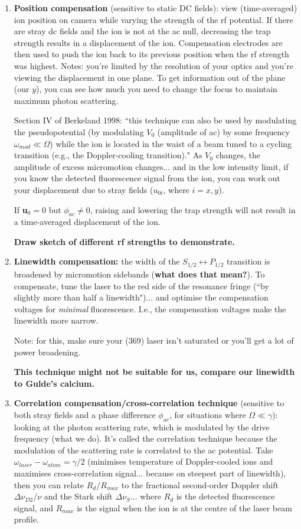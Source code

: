 \documentclass{article}
\begin{document}
\begin{enumerate}
\item \textbf{Position compensation} (sensitive to static DC fields): view (time-averaged) ion position on camera while varying the strength of the rf potential. If there are stray dc fields and the ion is not at the ac null, decreasing the trap strength results in a displacement of the ion. Compensation electrodes are then used to push the ion back to its previous position when the rf strength was highest. Notes: you're limited by the resolution of your optics and you're viewing the displacement in one plane. To get information out of the plane (our $y$), you can see how much you need to change the focus to maintain maximum photon scattering. 

Section IV of Berkeland 1998: ``this technique can also be used by modulating the pseudopotential (by modulating $V_0$ (amplitude of ac) by some frequency $\omega_{mod} \ll \Omega$) while the ion is located in the waist of a beam tuned to a cycling transition (e.g., the Doppler-cooling transition)." As $V_0$ changes, the amplitude of excess micromotion changes... and in the low intensity limit, if you know the detected fluorescence signal from the ion, you can work out your displacement due to stray fields ($u_{0i}$, where $i = x, y$).

If \textbf{u}$_0 = 0$ but $\phi_{ac} \neq 0$, raising and lowering the trap strength will not result in a time-averaged displacement of the ion.

\textbf{Draw sketch of different rf strengths to demonstrate.}

\item \textbf{Linewidth compensation:} the width of the $S_{1/2} \leftrightarrow P_{1/2}$ transition is broadened by micromotion sidebands (\textbf{what does that mean?}). To compensate, tune the laser to the red side of the resonance fringe (``by slightly more than half a linewidth")... and optimise the compensation voltages for \textit{minimal} fluorescence. I.e., the compensation voltages make the linewidth more narrow. 

Note: for this, make sure your (369) laser isn't saturated or you'll get a lot of power broadening. 

\textbf{This technique might not be suitable for us, compare our linewidth to Gulde's calcium.}

\item \textbf{Correlation compensation/cross-correlation technique} (sensitive to both stray fields and a phase difference $\phi_{ac}$, for situations where $\Omega \ll \gamma$): looking at the photon scattering rate, which is modulated by the drive frequency (what we do). It's called the correlation technique because the modulation of the scattering rate is correlated to the ac potential. Take $\omega_{laser} - \omega_{atom} = \gamma /2$ (minimises temperature of Doppler-cooled ions and maximises cross-correlation signal... because on steepest part of linewidth), then you can relate $R_d / R_{max}$ to the fractional second-order Doppler shift $\Delta \nu_{D2} / \nu$ and the Stark shift $\Delta \nu_S$... where $R_d$ is the detected fluorescence signal, and $R_{max}$ is the signal when the ion is at the centre of the laser beam profile.


\end{enumerate}
\end{document}
